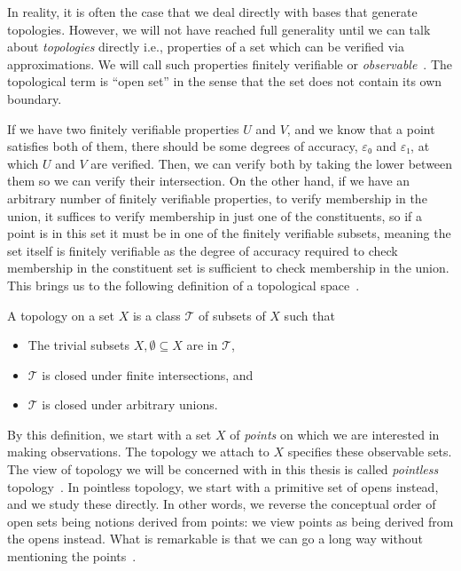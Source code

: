 In reality, it is often the case that we deal directly with bases that generate
topologies. However, we will not have reached full generality until we can talk about
\emph{topologies} directly i.e., properties of a set which can be verified via
approximations. We will call such properties finitely verifiable or
\emph{observable}~\cite{abramsky-thesis}. The topological term is ``open set'' in the
sense that the set does not contain its own boundary.

If we have two finitely verifiable properties $U$ and $V$, and we know that a point
satisfies both of them, there should be some degrees of accuracy, $ε₀$ and $ε₁$, at which
$U$ and $V$ are verified. Then, we can verify both by taking the lower between them so we
can verify their intersection. On the other hand, if we have an arbitrary number of
finitely verifiable properties, to verify membership in the union, it suffices to verify
membership in just one of the constituents, so if a point is in this set it must be in one
of the finitely verifiable subsets, meaning the set itself is finitely verifiable as the
degree of accuracy required to check membership in the constituent set is sufficient to
check membership in the union. This brings us to the following definition of a topological
space~\cite{munkres}.
\begin{defn}\label{defn:topospace}
  A topology on a set $X$ is a class $\mathcal{T}$ of subsets of $X$ such that
  \begin{itemize}
    \item The trivial subsets $X, \emptyset \subseteq X$ are in $\mathcal{T}$,
    \item $\mathcal{T}$ is closed under finite intersections, and
    \item $\mathcal{T}$ is closed under arbitrary unions.
  \end{itemize}
\end{defn}

By this definition, we start with a set $X$ of \emph{points} on which we are interested in
making observations. The topology we attach to $X$ specifies these observable sets. The
view of topology we will be concerned with in this thesis is called \emph{pointless}
topology~\cite{johnstone-the-point}. In pointless topology, we start with a primitive set
of opens instead, and we study these directly. In other words, we reverse the conceptual
order of open sets being notions derived from points: we view points as being derived from
the opens instead. What is remarkable is that we can go a long way without mentioning the
points~\cite{johnstone-the-point}.

